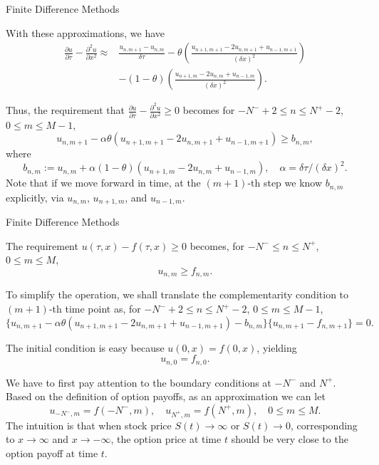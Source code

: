 \documentclass{beamer}
\begin{document}
\begin{frame}{Finite Difference Methods}

    {\footnotesize \footnotesize
    With these approximations, we have
    {\footnotesize \tiny
    \begin{align*}
    \frac{\partial u}{\partial \tau} - \frac{\partial^2 u}{\partial x^2} \approx & \frac{u_{n,m+1} - u_{n,m}}{\delta \tau} - \theta \left( \frac{u_{n+1,m+1} - 2u_{n,m+1} + u_{n-1,m+1}}{(\delta x)^2} \right) \\
    & - (1 - \theta) \left( \frac{u_{n+1,m} - 2u_{n,m} + u_{n-1,m}}{(\delta x)^2} \right).
    \end{align*}
        }

     \pause Thus, the requirement that $\frac{\partial u}{\partial \tau} - \frac{\partial^2 u}{\partial x^2} \geq 0$ becomes for $-N^- + 2 \leq n \leq N^+ - 2$, $0 \leq m \leq M - 1$,
    \[
    u_{n,m+1} - \alpha \theta (u_{n+1,m+1} - 2u_{n,m+1} + u_{n-1,m+1}) \geq b_{n,m}, 
    \]
    where
    \[
    b_{n,m} := u_{n,m} + \alpha (1 - \theta) (u_{n+1,m} - 2u_{n,m} + u_{n-1,m}),
    \quad \alpha = \delta\tau/(\delta x)^2.
    \]
     Note that if we move forward in time, at the $(m + 1)$-th step we
     know $b_{n,m}$ explicitly, via $u_{n,m}$, $u_{n+1,m}$, and $u_{n-1,m}$.

    }
    
    
\end{frame}

\begin{frame}{Finite Difference Methods}

    {\footnotesize \footnotesize
     The requirement $u(\tau, x) - f(\tau, x) \geq 0$ becomes, for $-N^- \leq n \leq N^+$, $0 \leq m \leq M$,
    \[
    u_{n,m} \geq f_{n,m}. 
    \]

    To simplify the operation, we shall translate the complementarity condition to $(m + 1)$-th time point as, for $-N^- + 2 \leq n \leq N^+ - 2$, $0 \leq m \leq M - 1$,
    \[
    \{u_{n,m+1} - \alpha \theta (u_{n+1,m+1} - 2u_{n,m+1} + u_{n-1,m+1}) - b_{n,m}\} \{u_{n,m+1} - f_{n,m+1}\} = 0.
    \]

     \pause The initial condition is easy because $u(0, x) = f(0, x)$, yielding
    \[
    u_{n, 0} = f_{n, 0}. 
    \]

    We have to first pay attention to the boundary conditions at $-N^{-}$ and $N^{+}$. 
    Based on the definition of option payoffs, as an approximation we can let
    \[
    u_{-N^{-},m} = f(-N^{-},m), \quad u_{N^{+},m} = f(N^{+},m), \quad 0 \leq m \leq M. 
    \]
     \pause  The intuition is that when stock price $S(t) \to \infty$ or $S(t) \to 0$, 
    corresponding to $x \to \infty$ and $x \to -\infty$, 
    the option price at time $t$ should be very close to the option payoff at time $t$.
    }
    
    
\end{frame}
\end{document}
